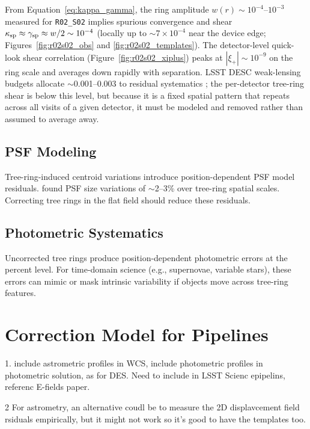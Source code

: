 From Equation~\ref{eq:kappa_gamma}, the ring amplitude $w(r)\sim10^{-4}$--$10^{-3}$ measured
for \texttt{R02\_S02} implies spurious convergence and shear
$\kappa_{\rm sp}\approx\gamma_{\rm sp}\approx w/2 \sim 10^{-4}$ (locally up to
$\sim7\times10^{-4}$ near the device edge; Figures~\ref{fig:r02s02_obs} and
\ref{fig:r02s02_templates}). The detector-level quick-look shear correlation
(Figure~\ref{fig:r02s02_xiplus}) peaks at $|\xi_+|\sim10^{-9}$ on the ring scale and averages
down rapidly with separation. LSST DESC weak-lensing budgets allocate $\sim$0.001--0.003 to
residual systematics \citep{LSST_ScienceBook}; the per-detector tree-ring shear is below this
level, but because it is a fixed spatial pattern that repeats across all visits of a given
detector, it must be modeled and removed rather than assumed to average away.

\subsection{PSF Modeling}

Tree-ring-induced centroid variations introduce position-dependent PSF model residuals. \citet{Esteves2023} found PSF size variations of $\sim$2--3\% over tree-ring spatial scales. Correcting tree rings in the flat field should reduce these residuals.

\subsection{Photometric Systematics}

Uncorrected tree rings produce position-dependent photometric errors at the percent level. For time-domain science (e.g., supernovae, variable stars), these errors can mimic or mask intrinsic variability if objects move across tree-ring features.

\section{Correction Model for Pipelines} \label{sec:correction}

1. include astrometric profiles in WCS, include photometric profiles in photometric solution, as for DES.  Need to include in LSST Scienc epipelins, referenc E-fields paper. 

2 For astrometry, an alternative coudl be to measure the 2D displavcement field rsiduals empirically, but it might not work so it's good to have the templates too. 




